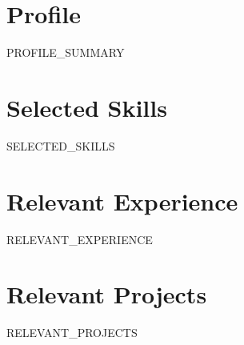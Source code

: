 \section{Profile}
{{PROFILE_SUMMARY}}

\section{Selected Skills}
{{SELECTED_SKILLS}}

\section{Relevant Experience}
{{RELEVANT_EXPERIENCE}}

\section{Relevant Projects}
{{RELEVANT_PROJECTS}}